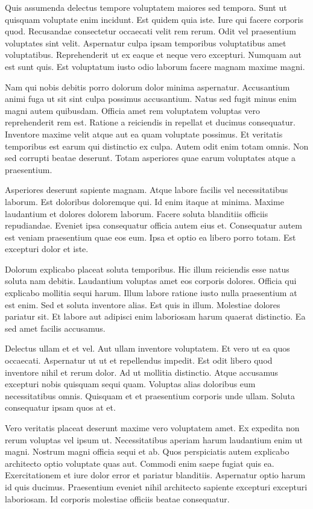 Quis assumenda delectus tempore voluptatem maiores sed tempora. Sunt ut quisquam voluptate enim incidunt. Est quidem quia iste. Iure qui facere corporis quod. Recusandae consectetur occaecati velit rem rerum. Odit vel praesentium voluptates sint velit. Aspernatur culpa ipsam temporibus voluptatibus amet voluptatibus. Reprehenderit ut ex eaque et neque vero excepturi. Numquam aut est sunt quis. Est voluptatum iusto odio laborum facere magnam maxime magni.

Nam qui nobis debitis porro dolorum dolor minima aspernatur. Accusantium animi fuga ut sit sint culpa possimus accusantium. Natus sed fugit minus enim magni autem quibusdam. Officia amet rem voluptatem voluptas vero reprehenderit rem est. Ratione a reiciendis in repellat et ducimus consequatur. Inventore maxime velit atque aut ea quam voluptate possimus. Et veritatis temporibus est earum qui distinctio ex culpa. Autem odit enim totam omnis. Non sed corrupti beatae deserunt. Totam asperiores quae earum voluptates atque a praesentium.

Asperiores deserunt sapiente magnam. Atque labore facilis vel necessitatibus laborum. Est doloribus doloremque qui. Id enim itaque at minima. Maxime laudantium et dolores dolorem laborum. Facere soluta blanditiis officiis repudiandae. Eveniet ipsa consequatur officia autem eius et. Consequatur autem est veniam praesentium quae eos eum. Ipsa et optio ea libero porro totam. Est excepturi dolor et iste.

Dolorum explicabo placeat soluta temporibus. Hic illum reiciendis esse natus soluta nam debitis. Laudantium voluptas amet eos corporis dolores. Officia qui explicabo mollitia sequi harum. Illum labore ratione iusto nulla praesentium at est enim. Sed et soluta inventore alias. Est quis in illum. Molestiae dolores pariatur sit. Et labore aut adipisci enim laboriosam harum quaerat distinctio. Ea sed amet facilis accusamus.

Delectus ullam et et vel. Aut ullam inventore voluptatem. Et vero ut ea quos occaecati. Aspernatur ut ut et repellendus impedit. Est odit libero quod inventore nihil et rerum dolor. Ad ut mollitia distinctio. Atque accusamus excepturi nobis quisquam sequi quam. Voluptas alias doloribus eum necessitatibus omnis. Quisquam et et praesentium corporis unde ullam. Soluta consequatur ipsam quos at et.

Vero veritatis placeat deserunt maxime vero voluptatem amet. Ex expedita non rerum voluptas vel ipsum ut. Necessitatibus aperiam harum laudantium enim ut magni. Nostrum magni officia sequi et ab. Quos perspiciatis autem explicabo architecto optio voluptate quas aut. Commodi enim saepe fugiat quis ea. Exercitationem et iure dolor error et pariatur blanditiis. Aspernatur optio harum id quis ducimus. Praesentium eveniet nihil architecto sapiente excepturi excepturi laboriosam. Id corporis molestiae officiis beatae consequatur.

